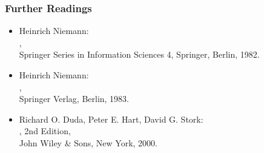 \begin{frame}
	\frametitle{Further Readings}

	\begin{itemize}
		\item Heinrich Niemann: \\
		      , \\
		      Springer Series in Information Sciences 4, Springer, Berlin, 1982. \\[.15cm]
		\item Heinrich Niemann: \\
		      , \\
		      Springer Verlag, Berlin, 1983. \\[.15cm]
		\item Richard O. Duda, Peter E. Hart, David G. Stork: \\
		      , 2nd Edition, \\
		      John Wiley \& Sons, New York, 2000.
	\end{itemize}
\end{frame}


